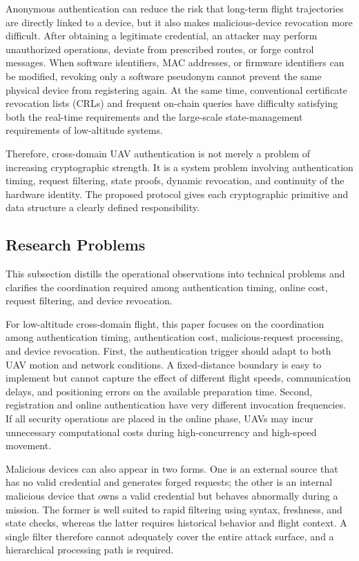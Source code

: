 \documentclass[lettersize,journal]{IEEEtran}
\begin{document}
	Anonymous authentication can reduce the risk that long-term flight trajectories are directly linked to a device, but it also makes malicious-device revocation more difficult. After obtaining a legitimate credential, an attacker may perform unauthorized operations, deviate from prescribed routes, or forge control messages. When software identifiers, MAC addresses, or firmware identifiers can be modified, revoking only a software pseudonym cannot prevent the same physical device from registering again. At the same time, conventional certificate revocation lists (CRLs) and frequent on-chain queries have difficulty satisfying both the real-time requirements and the large-scale state-management requirements of low-altitude systems.
	
	Therefore, cross-domain UAV authentication is not merely a problem of increasing cryptographic strength. It is a system problem involving authentication timing, request filtering, state proofs, dynamic revocation, and continuity of the hardware identity. The proposed protocol gives each cryptographic primitive and data structure a clearly defined responsibility.
	
	\subsection{Research Problems}
	This subsection distills the operational observations into technical problems and clarifies the coordination required among authentication timing, online cost, request filtering, and device revocation.
	
	
	For low-altitude cross-domain flight, this paper focuses on the coordination among authentication timing, authentication cost, malicious-request processing, and device revocation. First, the authentication trigger should adapt to both UAV motion and network conditions. A fixed-distance boundary is easy to implement but cannot capture the effect of different flight speeds, communication delays, and positioning errors on the available preparation time. Second, registration and online authentication have very different invocation frequencies. If all security operations are placed in the online phase, UAVs may incur unnecessary computational costs during high-concurrency and high-speed movement.
	
	Malicious devices can also appear in two forms. One is an external source that has no valid credential and generates forged requests; the other is an internal malicious device that owns a valid credential but behaves abnormally during a mission. The former is well suited to rapid filtering using syntax, freshness, and state checks, whereas the latter requires historical behavior and flight context. A single filter therefore cannot adequately cover the entire attack surface, and a hierarchical processing path is required.
	
\end{document}
